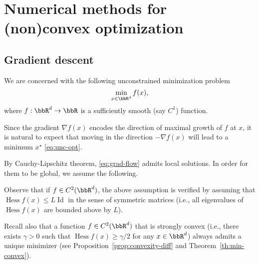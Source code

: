      \chapter{Numerical methods for (non)convex optimization}
 
     \section{Gradient descent}
 
     We are concerned with the following unconstrained minimization problem
     \begin{equation}
         \label{eq:unc-opt}
         \min_{x\in\bbR^d} f(x),
     \end{equation}
     where $f:\bbR^d\to \bbR$ is a sufficiently smooth (say $C^1$) function.
 
     Since the gradient $\nabla f(x)$ encodes the direction of maximal growth of $f$ at $x$, it is natural to expect that moving in the direction $-\nabla f(x)$ will lead to a minimum $x^\star$ \eqref{eq:unc-opt}.
 
 
     By Cauchy-Lipschitz theorem, \eqref{eq:grad-flow} admits local solutions.
     In order for them to be global, we assume the following.
 
 
     Observe that if $f\in C^2(\bbR^d)$, the above assumption is verified by assuming that $\operatorname{Hess} f(x)\le L \operatorname{Id}$ in the sense of symmetric matrices (i.e.,  all eigenvalues of $\operatorname{Hess}f(x)$ are bounded above by $L$).
 
     Recall also that a function $f\in C^2(\bbR^d)$ that is strongly convex (i.e., there exists $\gamma>0$ such that $\operatorname{Hess}f(x)\ge \gamma/2$ for any $x\in \bbR^d$) always admits a unique minimizer (see Proposition~\ref{prop:convexity-diff} and Theorem~\ref{th:min-convex}).
 
